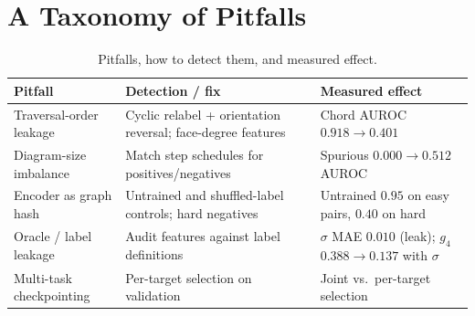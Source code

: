 \documentclass{article}
\begin{document}
\begin{table}[t]
\centering\small
\caption{Runtime on one CPU core.}
\label{tab:runtime}

\end{table}

\section{A Taxonomy of Pitfalls}\label{sec:pitfalls}
\begin{table}[h]
\centering\small
\caption{Pitfalls, how to detect them, and measured effect.}
\label{tab:pitfalls}
\begin{tabular}{p{3.2cm}p{4.2cm}p{4.3cm}}
\toprule
Pitfall & Detection / fix & Measured effect \\
\midrule
Traversal-order leakage & Cyclic relabel + orientation reversal; face-degree features & Chord AUROC $0.918\to0.401$ \\
Diagram-size imbalance & Match step schedules for positives/negatives & Spurious $0.000\to0.512$ AUROC \\
Encoder as graph hash & Untrained and shuffled-label controls; hard negatives & Untrained $0.95$ on easy pairs, $0.40$ on hard \\
Oracle / label leakage & Audit features against label definitions & $\sigma$ MAE $0.010$ (leak); $g_4$ $0.388\to0.137$ with $\sigma$ \\
Multi-task checkpointing & Per-target selection on validation & Joint vs.\ per-target selection \\
\bottomrule
\end{tabular}
\end{table}

\end{document}
